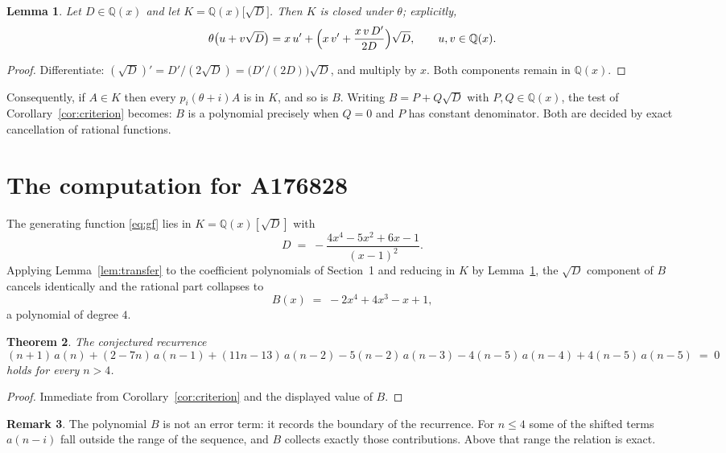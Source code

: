 \documentclass[11pt,a4paper]{article}
\theoremstyle{plain}
\newtheorem{theorem}{Theorem}
\newtheorem{lemma}[theorem]{Lemma}
\theoremstyle{definition}
\newtheorem{remark}[theorem]{Remark}
\begin{document}
\begin{lemma}\label{lem:field}
Let $D\in\mathbb{Q}(x)$ and let $K=\mathbb{Q}(x)\bigl[\sqrt{D}\bigr]$. Then $K$ is closed
under $\theta$; explicitly,
\[
\theta\bigl(u+v\sqrt{D}\bigr)=x\,u'+\Bigl(x\,v'+\frac{x\,v\,D'}{2D}\Bigr)\sqrt{D},
\qquad u,v\in\mathbb{Q}(x).
\]
\end{lemma}

\begin{proof}
Differentiate: $(\sqrt{D})'=D'/(2\sqrt{D})=\bigl(D'/(2D)\bigr)\sqrt{D}$, and multiply by
$x$. Both components remain in $\mathbb{Q}(x)$.
\end{proof}

Consequently, if $A\in K$ then every $p_{i}(\theta+i)A$ is in $K$, and so is $B$. Writing
$B=P+Q\sqrt{D}$ with $P,Q\in\mathbb{Q}(x)$, the test of Corollary~\ref{cor:criterion}
becomes: $B$ is a polynomial precisely when $Q=0$ and $P$ has constant denominator. Both
are decided by exact cancellation of rational functions.

\section{The computation for A176828}

The generating function \eqref{eq:gf} lies in $K=\mathbb{Q}(x)[\sqrt{D}]$ with
\[
D \;=\; - \frac{4 x^{4} - 5 x^{2} + 6 x - 1}{\left(x - 1\right)^{2}} .
\]
Applying Lemma~\ref{lem:transfer} to the coefficient polynomials of Section~1 and reducing
in $K$ by Lemma~\ref{lem:field}, the $\sqrt{D}$ component of $B$ cancels identically and
the rational part collapses to
\[
B(x)\;=\;- 2 x^{4} + 4 x^{3} - x + 1 ,
\]
a polynomial of degree $4$.

\begin{theorem}
The conjectured recurrence
\[
(n + 1)\,a(n) + (2 - 7 n)\,a(n-1) + (11 n - 13)\,a(n-2) -  5 \left(n - 2\right)\,a(n-3) -  4 \left(n - 5\right)\,a(n-4) + 4 \left(n - 5\right)\,a(n-5) \;=\;0
\]
holds for every $n>4$.
\end{theorem}

\begin{proof}
Immediate from Corollary~\ref{cor:criterion} and the displayed value of $B$.
\end{proof}

\begin{remark}
The polynomial $B$ is not an error term: it records the boundary of the recurrence. For
$n\le4$ some of the shifted terms $a(n-i)$ fall outside the range of the sequence,
and $B$ collects exactly those contributions. Above that range the relation is exact.
\end{remark}
\end{document}
